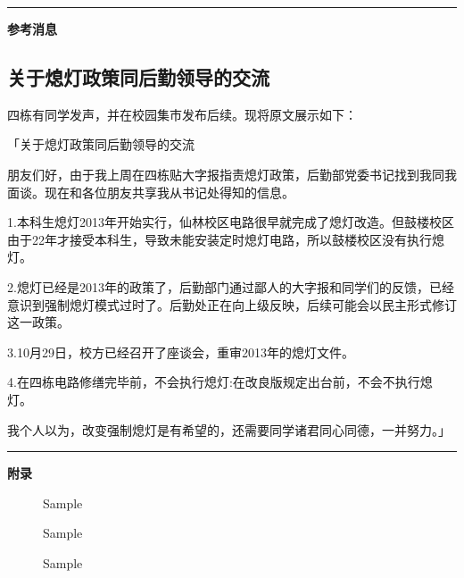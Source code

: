 \documentclass[letterpaper, 12pt]{article}
\begin{document}
\hrule
\vspace{4mm}
\centerline{\huge\textbf{参考消息}}
\begin{multicols}{2}
\section{关于熄灯政策同后勤领导的交流}
四栋有同学发声，并在校园集市发布后续。现将原文展示如下：

「关于熄灯政策同后勤领导的交流

朋友们好，由于我上周在四栋贴大字报指责熄灯政策，后勤部党委书记找到我同我面谈。现在和各位朋友共享我从书记处得知的信息。

1.本科生熄灯2013年开始实行，仙林校区电路很早就完成了熄灯改造。但鼓楼校区由于22年才接受本科生，导致未能安装定时熄灯电路，所以鼓楼校区没有执行熄灯。

2.熄灯已经是2013年的政策了，后勤部门通过鄙人的大字报和同学们的反馈，已经意识到强制熄灯模式过时了。后勤处正在向上级反映，后续可能会以民主形式修订这一政策。

3.10月29日，校方已经召开了座谈会，重审2013年的熄灯文件。

4.在四栋电路修缮完毕前，不会执行熄灯:在改良版规定出台前，不会不执行熄灯。

我个人以为，改变强制熄灯是有希望的，还需要同学诸君同心同德，一并努力。」
\end{multicols} 
\hrule
\vspace{4mm}
\centerline{\huge\textbf{附录}}
\begin{figure}[htbp]
    \centering
    \begin{minipage}[b]{0.32\textwidth}
        \centering
        \caption{Sample}
    \end{minipage}
    \begin{minipage}[b]{0.32\textwidth}
        \centering
        \caption{Sample}
    \end{minipage}
        \begin{minipage}[b]{0.32\textwidth}
        \centering
        \caption{Sample}
    \end{minipage}
\end{figure}
\end{document}
